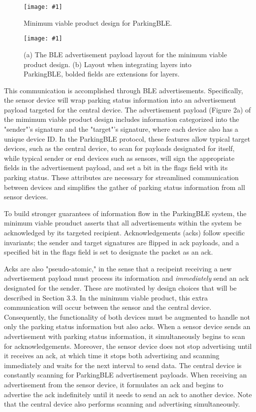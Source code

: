 \documentclass[sigconf]{acmart}
\def\smallcolfig#1{\texttt{[image: \#1]}}
\def\colfig#1{\texttt{[image: \#1]}}
\begin{document}
\begin{figure}
  \centerline{\smallcolfig{figs/mvp.pdf}}
    \caption{Minimum viable product design for ParkingBLE.}
    \label{fig:mvp}
\end{figure}

\begin{figure}
  \centerline{\colfig{figs/adv.pdf}}
    \caption{(a) The BLE advertisement payload layout for the minimum
    viable product design. (b) Layout when integrating layers into
    ParkingBLE, bolded fields are extensions for layers.}
    \label{fig:adv}
\end{figure}


This communication is accomplished through BLE advertisements. Specifically, the
sensor device will wrap parking status information into an advertisement payload
targeted for the central device. The advertisement payload (Figure 2a) of the
mimimum viable product design includes information categorized into the "sender"'s
signature and the "target"'s signature, where each device also has a unique device
ID. In the ParkingBLE protocol, these features allow typical target devices, such
as the central device, to scan for payloads designated for itself, while typical
sender or end devices such as sensors, will sign the appropriate fields in the
advertisement payload, and set a bit in the flags field with its parking status. These
attributes are necessary for streamlined communication between devices and simplifies
the gather of parking status information from all sensor devices. \newline

To build stronger guarantees of information flow in the ParkingBLE system, the
minimum viable prouduct asserts that all advertisements within the system be
acknowledged by its targeted recipient. Acknowledgements (acks) follow specific
invariants; the sender and target signatures are flipped in ack payloads, and
a specified bit in the flags field is set to designate the packet as an ack. \newline

Acks are also "pseudo-atomic," in the sense that a recipeint receiving a new
advertisement payload must process its information and \textit{immediately}
send an ack designated for the sender. These are motivated by design choices that
will be described in Section 3.3. In the minimum viable product, this extra
communication will occur between the sensor and the central device. Consequently,
the functionality of both devices must be augmented to handle not only the
parking status information but also acks. When a sensor device sends an
advertisement with parking status information, it simultaneously begins to
scan for acknowledgements. Moreover, the sensor device does not stop advertising
until it receives an ack, at which time it stops both advertising and scanning
immediately and waits for the next interval to send data. The central device is
constantly scanning for ParkingBLE advertisement payloads. When receiving an
advertisement from the sensor device, it formulates an ack and begins to advertise
the ack indefinitely until it needs to send an ack to another device. Note that
the central device also performs scanning and advertising simultaneously. \newline
\end{document}
